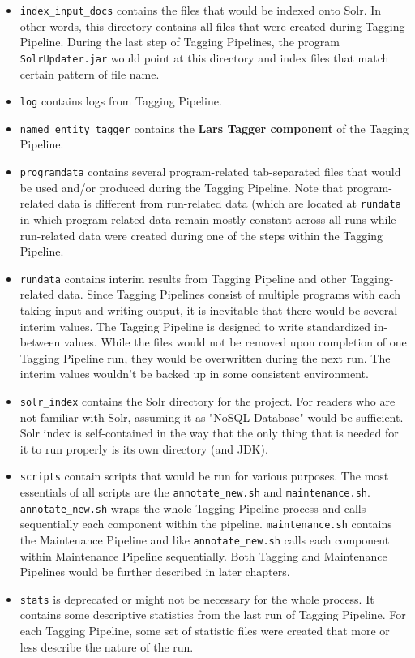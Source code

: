\begin{itemize}
\item \texttt{index\_input\_docs} contains the files that would be indexed onto Solr. In other words, this directory contains all files that were created during Tagging Pipeline. During the last step of Tagging Pipelines, the program \texttt{SolrUpdater.jar} would point at this directory and index files that match certain pattern of file name.
\item \texttt{log} contains logs from Tagging Pipeline.
\item \texttt{named\_entity\_tagger} contains the \textbf{Lars Tagger component} of the Tagging Pipeline.
\item \texttt{programdata} contains several program-related tab-separated files that would be used and/or produced during the Tagging Pipeline. Note that program-related data is different from run-related data (which are located at \texttt{rundata} in which program-related data remain mostly constant across all runs while run-related data were created during one of the steps within the Tagging Pipeline. 
\item \texttt{rundata} contains interim results from Tagging Pipeline and other Tagging-related data. Since Tagging Pipelines consist of multiple programs with each taking input and writing output, it is inevitable that there would be several interim values. The Tagging Pipeline is designed to write standardized in-between values. While the files would not be removed upon completion of one Tagging Pipeline run, they would be overwritten during the next run. The interim values wouldn't be backed up in some consistent environment.
\item \texttt{solr\_index} contains the Solr directory for the project. For readers who are not familiar with Solr, assuming it as "NoSQL Database" would be sufficient. Solr index is self-contained in the way that the only thing that is needed for it to run properly is its own directory (and JDK).
\item \texttt{scripts} contain scripts that would be run for various purposes. The most essentials of all scripts are the \texttt{annotate\_new.sh} and \texttt{maintenance.sh}. \texttt{annotate\_new.sh} wraps the whole Tagging Pipeline process and calls sequentially each component within the pipeline. \texttt{maintenance.sh} contains the Maintenance Pipeline and like \texttt{annotate\_new.sh} calls each component within Maintenance Pipeline sequentially. Both Tagging and Maintenance Pipelines would be further described in later chapters.
\item \texttt{stats} is deprecated or might not be necessary for the whole process. It contains some descriptive statistics from the last run of Tagging Pipeline. For each Tagging Pipeline, some set of statistic files were created that more or less describe the nature of the run.
\end{itemize}